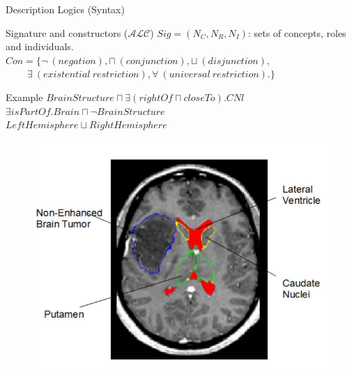 \documentclass{beamer}
\begin{document}
\begin{frame}{Description Logics (Syntax)}
\begin{block}{Signature and constructors ($\mathcal{ALC}$)}
$Sig=(N_C,N_R,N_I)$: sets of concepts, roles and individuals.\\
$Con=\{\neg~(negation),\sqcap~(conjunction),\sqcup~(disjunction),$\\$~~~~~~~~~~\exists~(existential~restriction),\forall~(universal~restriction).\}$
\end{block}

\begin{exampleblock}{Example}
$BrainStructure \sqcap \exists (rightOf \sqcap closeTo). CNl$\\
$\exists isPartOf. Brain \sqcap \neg BrainStructure$\\
$LeftHemisphere\sqcup RightHemisphere$
\end{exampleblock}
	\begin{figure}
	\includegraphics[width=.3\textwidth]{images/cerebrale.png}
	\end{figure}
\end{frame}


% 
% 
\end{document}
